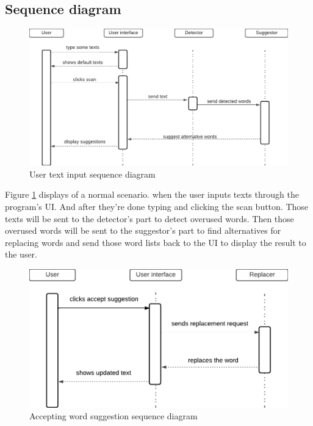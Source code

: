 \documentclass[12pt,oneside,openright,a4paper]{cpe-english-project}
\begin{document}
\subsection{Sequence diagram}
\begin{figure}[!h]\centering
\includegraphics[width=15cm]{./img/chp3/Sequence1.png}
\caption{User text input sequence diagram}\label{fig:seq1}
\end{figure}

Figure \ref{fig:seq1} displays of a normal scenario. when the user inputs texts through the program’s UI. And after they’re done typing and clicking the scan button. Those texts will be sent to the detector's part to detect overused words. Then those overused words will be sent to the suggestor’s part to find alternatives for replacing words and send those word lists back to the UI to display the result to the user.

\begin{figure}[!h]\centering
\includegraphics[width=15cm]{./img/chp3/Sequence2.png}
\caption{Accepting word suggestion sequence diagram}\label{fig:seq2}
\end{figure}
\end{document}
